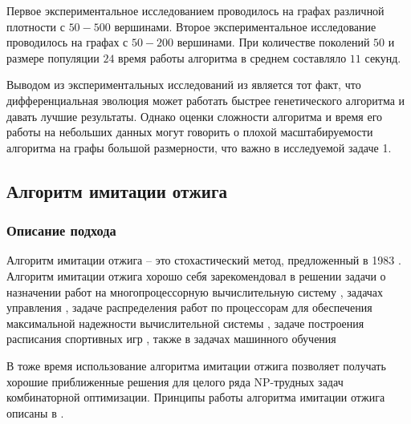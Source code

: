 \documentclass{article}
\begin{document}
Первое экспериментальное исследованием проводилось на графах различной плотности с $50-500$ вершинами. Второе экспериментальное исследование проводилось на графах с $50-200$ вершинами. При количестве поколений $50$ и размере популяции $24$ время работы алгоритма в среднем составляло $11$ секунд. \par
Выводом из экспериментальных исследований из \cite{Krzysztof_2005} является тот факт, что дифференциальная эволюция может работать быстрее генетического алгоритма и давать лучшие результаты. Однако оценки сложности алгоритма и время его работы на небольших данных могут говорить о плохой масштабируемости алгоритма на графы большой размерности, что важно в исследуемой задаче 1.
\newpage

\subsection{Алгоритм имитации отжига}
\subsubsection{Описание подхода}
Алгоритм имитации отжига – это стохастический метод, предложенный в 1983 \cite{Kirkpatrick_1983}. Алгоритм имитации отжига хорошо себя зарекомендовал в решении задачи о назначении работ на многопроцессорную вычислительную систему \cite{Yskandar_2000}, задачах управления \cite{Yang_2021}, задаче распределения работ по процессорам для обеспечения максимальной надежности вычислительной системы \cite{Gamal_2006}, задаче построения расписания спортивных игр \cite{Rosati_2021}, также в задачах машинного обучения \cite{Shih-Wei_2008} \par
В тоже время использование алгоритма имитации отжига позволяет получать хорошие приближенные решения для целого ряда NP-трудных задач комбинаторной оптимизации. Принципы работы алгоритма имитации отжига описаны в \cite{Wasserman_1988}.
\end{document}

